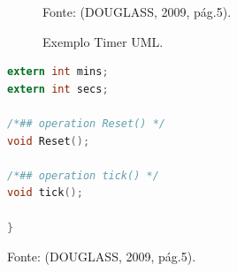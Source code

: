 \begin{figure}[h]
\centering

	Fonte: (DOUGLASS, 2009, pág.5).\linebreak
{}
\caption{Exemplo Timer UML.}
\end{figure}

\newpage

\renewcommand{\lstlistingname}{Código}


\begin{lstlisting}[caption={Transcrição do Timer UML para código em C.},label={lst:codigo3},language=C]
extern int mins; 
extern int secs;

/*## operation Reset() */
void Reset();

/*## operation tick() */
void tick();

}
\end{lstlisting}
\begin{center}
Fonte: (DOUGLASS, 2009, pág.5).
\end{center}


